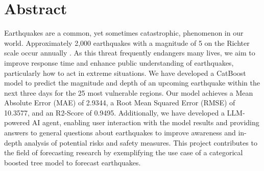 \chapter*{Abstract}

Earthquakes are a common, yet sometimes catastrophic, phenomenon in our world. Approximately 2,000 earthquakes with a magnitude of 5 on the Richter scale occur annually \parencite{welt_erdbeben}. As this threat frequently endangers many lives, we aim to improve response time and enhance public understanding of earthquakes, particularly how to act in extreme situations. We have developed a CatBoost model to predict the magnitude and depth of an upcoming earthquake within the next three days for the 25 most vulnerable regions. Our model achieves a Mean Absolute Error (MAE) of 2.9344, a Root Mean Squared Error (RMSE) of 10.3577, and an R2-Score of 0.9495. Additionally, we have developed a \ac{LLM}-powered AI agent, enabling user interaction with the model results and providing answers to general questions about earthquakes to improve awareness and in-depth analysis of potential risks and safety measures. This project contributes to the field of forecasting research by exemplifying the use case of a categorical boosted tree model to forecast earthquakes.


